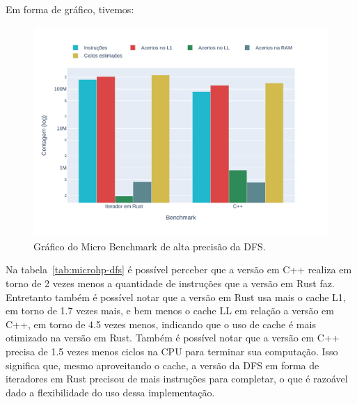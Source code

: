 Em forma de gráfico, tivemos:

\begin{figure}[!ht]
  \centering
  \caption{Gráfico do Micro Benchmark de alta precisão da DFS.}
  \includegraphics[width=\textwidth]{figures/benchmark-chart.pdf}
\end{figure}
\FloatBarrier

Na tabela~\ref{tab:microhp-dfs} é possível perceber que a versão em
C++ realiza em torno de 2 vezes menos a quantidade de instruções que
a versão em Rust faz. Entretanto também é possível notar que a versão
em Rust usa mais o cache L1, em torno de 1.7 vezes mais, e bem menos
o cache LL em relação a versão em C++, em torno de 4.5 vezes menos,
indicando que o uso de cache é mais otimizado na versão em Rust.
Também é possível notar que a versão em C++ precisa de 1.5 vezes
menos ciclos na CPU para terminar sua computação. Isso significa que,
mesmo aproveitando o cache, a versão da DFS em forma de iteradores em
Rust precisou de mais instruções para completar, o que é razoável
dado a flexibilidade do uso dessa implementação.
